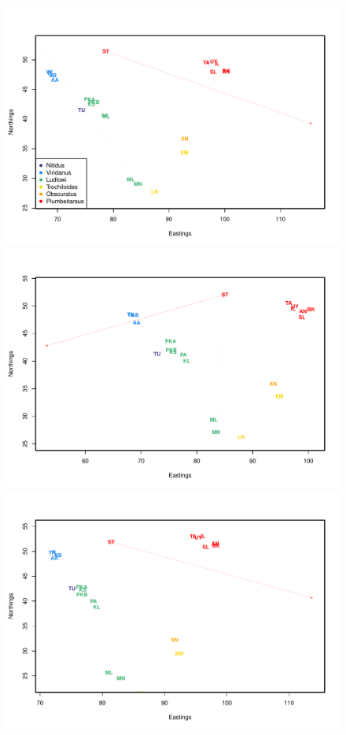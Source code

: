 \documentclass[10pt,letterpaper]{article}
\begin{document}
\begin{figure}
	\centering
		\subcaptionbox{\label{warb_pop_realpr1}}
			{\includegraphics[height=.3\textheight]{../figs/warblers/population_warbler_map_realpr1.pdf}}
		\subcaptionbox{\label{warb_pop_realpr2}}			
			{\includegraphics[height=.3\textheight]{../figs/warblers/population_warbler_map_realpr2.pdf}}
		\subcaptionbox{\label{warb_pop_randpr1}}
			{\includegraphics[height=.3\textheight]{../figs/warblers/population_warbler_map_randpr1.pdf}}

\end{figure}
\end{document}
